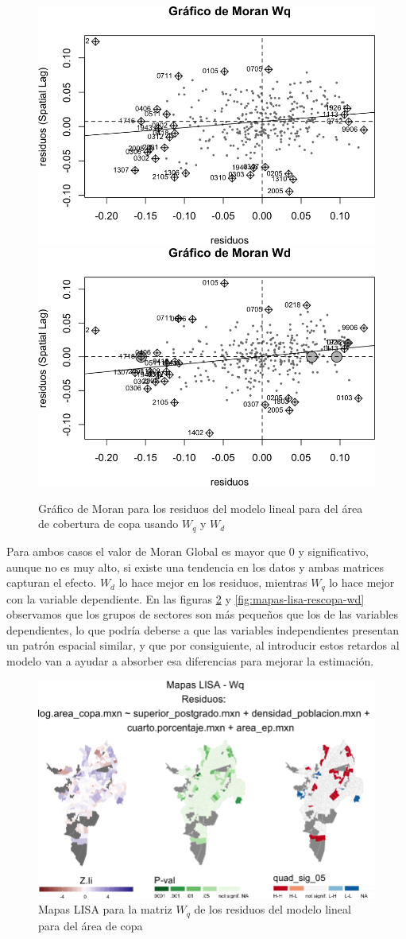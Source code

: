 \documentclass[12pt,]{book}
\begin{document}
\begin{figure}
\includegraphics[width=0.49\linewidth]{tesis-unigis_files/figure-latex/moranplot-rescopa-w-1} \includegraphics[width=0.49\linewidth]{tesis-unigis_files/figure-latex/moranplot-rescopa-w-2} \caption{Gráfico de Moran para los residuos del modelo lineal para del área de cobertura de copa usando $W_{q}$ y $W_{d}$ }\label{fig:moranplot-rescopa-w}
\end{figure}

Para ambos casos el valor de Moran Global es mayor que 0 y
significativo, aunque no es muy alto, si existe una tendencia en los
datos y ambas matrices capturan el efecto. \(W_d\) lo hace mejor en los
residuos, mientras \(W_q\) lo hace mejor con la variable dependiente. En
las figuras \ref{fig:mapas-lisa-rescopa-wq} y
\ref{fig:mapas-lisa-rescopa-wd} observamos que los grupos de sectores
son más pequeños que los de las variables dependientes, lo que podría
deberse a que las variables independientes presentan un patrón espacial
similar, y que por consiguiente, al introducir estos retardos al modelo
van a ayudar a absorber esa diferencias para mejorar la estimación.

\begin{figure}
\includegraphics[width=1\linewidth]{tesis-unigis_files/figure-latex/mapas-lisa-rescopa-wq-1} \caption{Mapas LISA para la matriz $W_q$ de los residuos del modelo lineal para del área de copa}\label{fig:mapas-lisa-rescopa-wq}
\end{figure}
\end{document}
